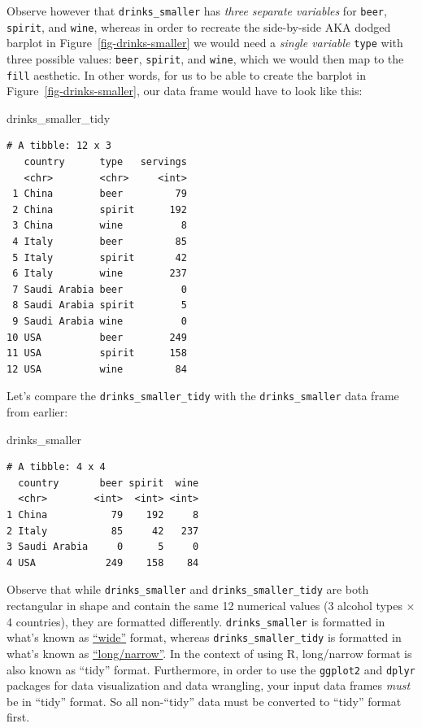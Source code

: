 \documentclass[
  letterpaper,
  DIV=11,
  numbers=noendperiod]{scrreprt}
\newenvironment{Shaded}{\begin{snugshade}}{\end{snugshade}}
\newcommand{\NormalTok}[1]{\textcolor[rgb]{0.00,0.23,0.31}{#1}}
\theoremstyle{definition}
\theoremstyle{remark}
\begin{document}
Observe however that \texttt{drinks\_smaller} has \emph{three separate
variables} for \texttt{beer}, \texttt{spirit}, and \texttt{wine},
whereas in order to recreate the side-by-side AKA dodged barplot in
Figure~\ref{fig-drinks-smaller} we would need a \emph{single variable}
\texttt{type} with three possible values: \texttt{beer},
\texttt{spirit}, and \texttt{wine}, which we would then map to the
\texttt{fill} aesthetic. In other words, for us to be able to create the
barplot in Figure~\ref{fig-drinks-smaller}, our data frame would have to
look like this:

\begin{Shaded}
\begin{Highlighting}[]
\NormalTok{drinks\_smaller\_tidy}
\end{Highlighting}
\end{Shaded}

\begin{verbatim}
# A tibble: 12 x 3
   country      type   servings
   <chr>        <chr>     <int>
 1 China        beer         79
 2 China        spirit      192
 3 China        wine          8
 4 Italy        beer         85
 5 Italy        spirit       42
 6 Italy        wine        237
 7 Saudi Arabia beer          0
 8 Saudi Arabia spirit        5
 9 Saudi Arabia wine          0
10 USA          beer        249
11 USA          spirit      158
12 USA          wine         84
\end{verbatim}

Let's compare the \texttt{drinks\_smaller\_tidy} with the
\texttt{drinks\_smaller} data frame from earlier:

\begin{Shaded}
\begin{Highlighting}[]
\NormalTok{drinks\_smaller}
\end{Highlighting}
\end{Shaded}

\begin{verbatim}
# A tibble: 4 x 4
  country       beer spirit  wine
  <chr>        <int>  <int> <int>
1 China           79    192     8
2 Italy           85     42   237
3 Saudi Arabia     0      5     0
4 USA            249    158    84
\end{verbatim}

Observe that while \texttt{drinks\_smaller} and
\texttt{drinks\_smaller\_tidy} are both rectangular in shape and contain
the same 12 numerical values (3 alcohol types \(\times\) 4 countries),
they are formatted differently. \texttt{drinks\_smaller} is formatted in
what's known as
\href{https://en.wikipedia.org/wiki/Wide_and_narrow_data}{``wide''}
format, whereas \texttt{drinks\_smaller\_tidy} is formatted in what's
known as
\href{https://en.wikipedia.org/wiki/Wide_and_narrow_data\#Narrow}{``long/narrow''}.
In the context of using R, long/narrow format is also known as ``tidy''
format. Furthermore, in order to use the \texttt{ggplot2} and
\texttt{dplyr} packages for data visualization and data wrangling, your
input data frames \emph{must} be in ``tidy'' format. So all non-``tidy''
data must be converted to ``tidy'' format first.
\end{document}

